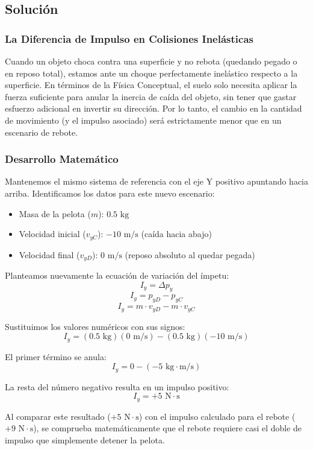 \documentclass{article}
\begin{document}
\subsection*{Solución}

\subsubsection*{La Diferencia de Impulso en Colisiones Inelásticas}
Cuando un objeto choca contra una superficie y no rebota (quedando pegado o en reposo total), estamos ante un choque perfectamente inelástico respecto a la superficie. En términos de la Física Conceptual, el suelo solo necesita aplicar la fuerza suficiente para anular la inercia de caída del objeto, sin tener que gastar esfuerzo adicional en invertir su dirección. Por lo tanto, el cambio en la cantidad de movimiento (y el impulso asociado) será estrictamente menor que en un escenario de rebote.

\subsubsection*{Desarrollo Matemático}
Mantenemos el mismo sistema de referencia con el eje Y positivo apuntando hacia arriba.
Identificamos los datos para este nuevo escenario:
\begin{itemize}
    \item Masa de la pelota ($m$): $0.5 \text{ kg}$
    \item Velocidad inicial ($v_{yC}$): $-10 \text{ m/s}$ (caída hacia abajo)
    \item Velocidad final ($v_{yD}$): $0 \text{ m/s}$ (reposo absoluto al quedar pegada)
\end{itemize}

Planteamos nuevamente la ecuación de variación del ímpetu:
$$I_y = \Delta p_y$$
$$I_y = p_{yD} - p_{yC}$$
$$I_y = m \cdot v_{yD} - m \cdot v_{yC}$$

Sustituimos los valores numéricos con sus signos:
$$I_y = (0.5 \text{ kg})(0 \text{ m/s}) - (0.5 \text{ kg})(-10 \text{ m/s})$$

El primer término se anula:
$$I_y = 0 - (-5 \text{ kg}\cdot\text{m/s})$$

La resta del número negativo resulta en un impulso positivo:
$$I_y = +5 \text{ N}\cdot\text{s}$$

Al comparar este resultado ($+5 \text{ N}\cdot\text{s}$) con el impulso calculado para el rebote ($+9 \text{ N}\cdot\text{s}$), se comprueba matemáticamente que el rebote requiere casi el doble de impulso que simplemente detener la pelota.
\end{document}
